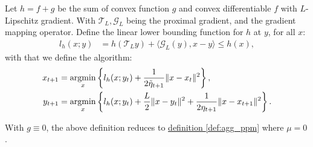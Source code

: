         \begin{definition}
            \label{def:ag_prox_grad_ppm}
            Let $h=f + g$ be the sum of convex function $g$ and convex differentiable $f$ with $L$-Lipschitz gradient. 
            With $\mathcal T_L, \mathcal G_L$ being the proximal gradient, and the gradient mapping operator. 
            Define the linear lower bounding function for $h$ at $y$, for all $x$: 
            $$
            \begin{aligned}
                l_h(x; y) &= h(\mathcal T_L y) + \langle \mathcal G_L(y), x - y \rangle \le h(x), 
            \end{aligned}
            $$
            with that we define the algorithm:
            $$
            \begin{aligned}
                x_{t + 1} &= \mathop{\rm argmin}\limits_{x} \left\lbrace
                    l_h(x; y_t) + \frac{1}{2\tilde \eta_{t + 1}} 
                    \Vert x - x_t\Vert^2
                \right\rbrace,
                \\
                y_{t + 1}&= 
                \mathop{\rm argmin}\limits_{x}
                \left\lbrace
                    l_h(x; y_t) + \frac{L}{2}\Vert x - y_t\Vert^2 + 
                    \frac{1}{2\eta_{t + 1}} \Vert x - x_{t + 1}\Vert^2
                \right\rbrace.
            \end{aligned}
            $$
        \end{definition}
        \begin{observation}
            With $g \equiv 0$, the above definition reduces to 
            \hyperref[def:agg_ppm]{definition \ref*{def:agg_ppm}}
            where $\mu = 0$. 
        \end{observation}

